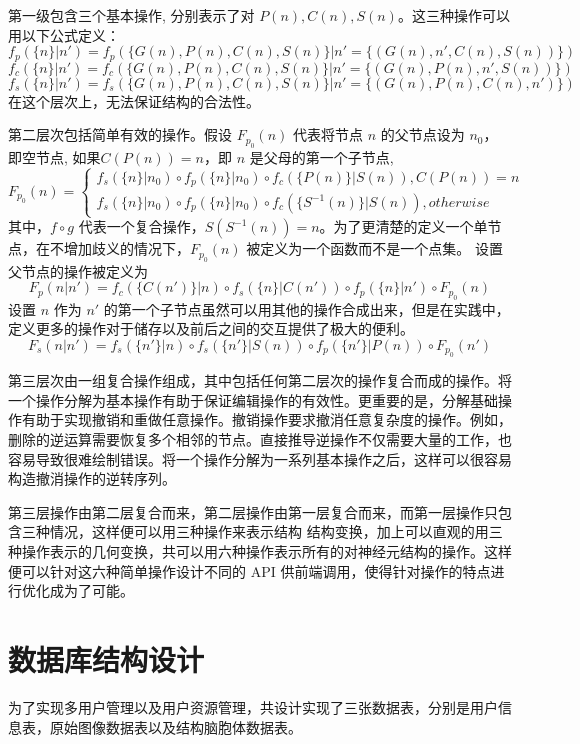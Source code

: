 第一级包含三个基本操作, 分别表示了对 $P(n), C(n), S(n)$。这三种操作可以用以下公式定义：
$$f_p(\{n\}|n') = f_p(\{G(n), P(n), C(n), S(n)\}|n' = \{(G(n), n', C(n), S(n))\})$$
$$f_c(\{n\}|n') = f_c(\{G(n), P(n), C(n), S(n)\}|n' = \{(G(n), P(n), n', S(n))\})$$
$$f_s(\{n\}|n') = f_s(\{G(n), P(n), C(n), S(n)\}|n' = \{(G(n), P(n), C(n), n')\})$$
在这个层次上，无法保证结构的合法性。

第二层次包括简单有效的操作。假设 $F_{p_0}(n)$ 代表将节点 $n$ 的父节点设为 $n_0$， 即空节点, 如果$C(P(n)) = n$，即 $n$ 是父母的第一个子节点,
$$
F_{p_0}(n) =
\left\{
\begin{aligned}
f_s(\{n\} | n_0) \circ f_p(\{n\} | n_0) \circ f_c(\{P(n)\} | S(n)), C(P(n)) = n\\
f_s(\{n\} | n_0) \circ f_p(\{n\} | n_0) \circ f_c(\{S^{-1}(n)\} | S(n)), otherwise
\end{aligned}
\right.
$$
其中，$f \circ g$ 代表一个复合操作，$S(S^{-1}(n)) = n$。为了更清楚的定义一个单节点，在不增加歧义的情况下，$F_{p_0}(n)$ 被定义为一个函数而不是一个点集。
设置父节点的操作被定义为
$$F_p(n|n') = f_c(\{C(n')\}|n) \circ f_s(\{n\}|C(n'))  \circ f_p(\{n\}|n') \circ F_{p_0}(n)$$
设置 $n$ 作为 $n'$ 的第一个子节点虽然可以用其他的操作合成出来，但是在实践中，定义更多的操作对于储存以及前后之间的交互提供了极大的便利。
$$F_s(n|n') = f_s(\{n'\}|n) \circ f_s(\{n'\}|S(n))  \circ f_p(\{n'\}|P(n)) \circ F_{p_0}(n')$$

第三层次由一组复合操作组成，其中包括任何第二层次的操作复合而成的操作。将一个操作分解为基本操作有助于保证编辑操作的有效性。更重要的是，分解基础操作有助于实现撤销和重做任意操作。撤销操作要求撤消任意复杂度的操作。例如，删除的逆运算需要恢复多个相邻的节点。直接推导逆操作不仅需要大量的工作，也容易导致很难绘制错误。将一个操作分解为一系列基本操作之后，这样可以很容易构造撤消操作的逆转序列。

第三层操作由第二层复合而来，第二层操作由第一层复合而来，而第一层操作只包含三种情况，这样便可以用三种操作来表示结构
结构变换，加上可以直观的用三种操作表示的几何变换，共可以用六种操作表示所有的对神经元结构的操作。这样便可以针对这六种简单操作设计不同的 API 供前端调用，使得针对操作的特点进行优化成为了可能。

\section{数据库结构设计}
为了实现多用户管理以及用户资源管理，共设计实现了三张数据表，分别是用户信息表，原始图像数据表以及结构脑胞体数据表。

